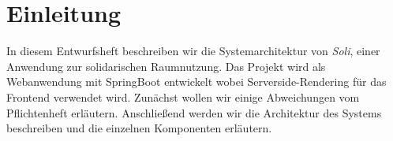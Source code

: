 
\chapter{Einleitung}
\label{ch:preface}


In diesem Entwurfsheft beschreiben wir die Systemarchitektur von \textit{Soli}, einer Anwendung zur solidarischen Raumnutzung.
Das Projekt wird als Webanwendung mit SpringBoot entwickelt wobei Serverside-Rendering für das Frontend verwendet wird.
Zunächst wollen wir einige Abweichungen vom Pflichtenheft erläutern.
Anschließend werden wir die Architektur des Systems beschreiben und die einzelnen Komponenten erläutern.